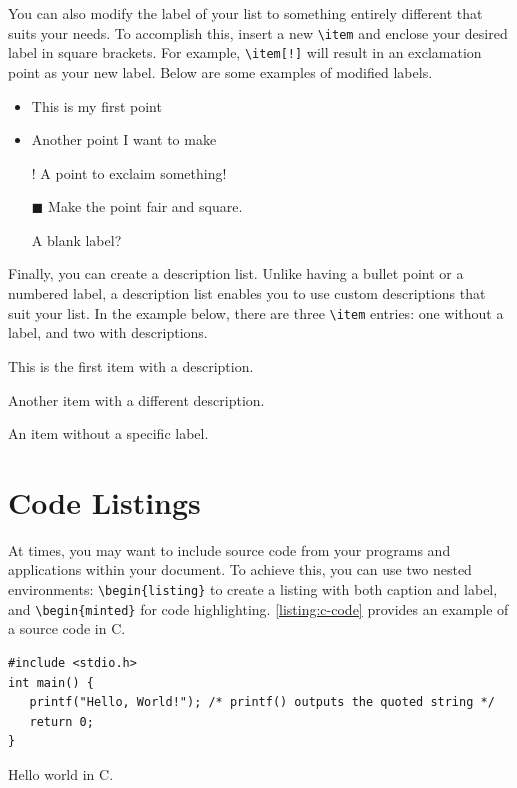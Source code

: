 {You can also modify the label of your list to something entirely different that suits your needs. To accomplish this, insert a new \verb|\item| and enclose your desired label in square brackets. For example, \verb|\item[!]| will result in an exclamation point as your new label. Below are some examples of modified labels.

\begin{itemize}
  \item This is my first point
  \item Another point I want to make 
  \item[!] A point to exclaim something!
  \item[$\blacksquare$] Make the point fair and square.
  \item[] A blank label?
\end{itemize}

Finally, you can create a description list. Unlike having a bullet point or a numbered label, a description list enables you to use custom descriptions that suit your list. In the example below, there are three \verb|\item| entries: one without a label, and two with descriptions.

\begin{description}
    \item[Item 1:] This is the first item with a description.
    \item[Item 2:] Another item with a different description.
    \item An item without a specific label.
\end{description}

\section{Code Listings}
At times, you may want to include source code from your programs and applications within your document. To achieve this, you can use two nested environments: \verb|\begin{listing}| to create a listing with both caption and label, and \verb|\begin{minted}| for code highlighting. \autoref{listing:c-code} provides an example of a source code in C.

\begin{listing}[!htpb]
\begin{verbatim}
#include <stdio.h>
int main() {
   printf("Hello, World!"); /* printf() outputs the quoted string */
   return 0;
}
\end{verbatim}
\caption{Hello world in C.}
\label{listing:c-code}
\end{listing}

}
